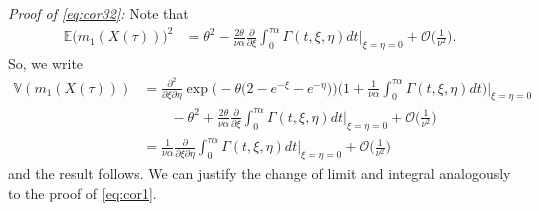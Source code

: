 \documentclass{imsart}
\theoremstyle{plain}
\theoremstyle{definition}
\begin{document}
\noindent\emph{Proof of \eqref{eq:cor32}:}
Note that
\begin{align*}
    \mathbb E\big(m_1(X(\tau))\big)^2 & = \theta^2 - \frac{2\theta}{\nu \alpha} \frac{\partial}{\partial\xi}\int_0^{\tau\alpha}  \Gamma(t,\xi,\eta) dt \Big|_{\xi = \eta = 0} + \mathcal O\Big(\frac{1}{\nu^2}\Big).
\end{align*}
So, we write
\begin{align*}
    \mathbb V(m_1(X(\tau))) & = \frac{\partial^2}{\partial\xi \partial \eta} \exp\Big( -\theta\Big(2 - e^{-\xi} - e^{-\eta}\Big)\Big)\Big(1 + \frac{1}{\nu \alpha} \int_0^{\tau\alpha} \Gamma(t, \xi, \eta) dt \Big)\Big|_{\xi = \eta = 0}  \\ & \qquad - \theta^2  + \frac{2\theta}{\nu \alpha} \frac{\partial}{\partial\xi} \int_0^{\tau\alpha} \Gamma(t,\xi,\eta)dt\Big|_{\xi=\eta = 0} +  \mathcal O\Big(\frac{1}{\nu^2}\Big)  \\ & = \frac{1}{\nu \alpha} \frac{\partial} {\partial\xi \partial \eta} \int_0^{\tau\alpha} \Gamma(t, \xi, \eta) dt\Big|_{\xi = \eta = 0} +  \mathcal O\Big(\frac{1}{\nu^2}\Big) 
\end{align*}
and the result follows. We can justify the change of limit and integral analogously to the proof of \eqref{eq:cor1}.
\end{document}
